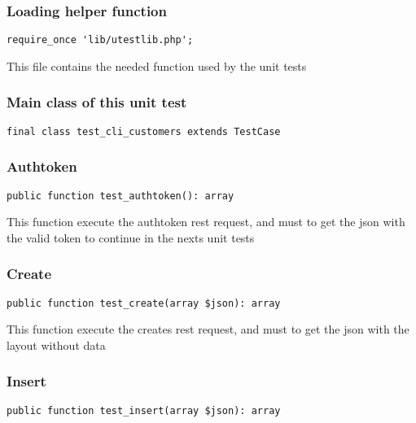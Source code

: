 \documentclass[a4paper]{article}
\begin{document}
\hypertarget{toc59}{}
\subsubsection{Loading helper function}

\begin{lstlisting}
require_once 'lib/utestlib.php';
\end{lstlisting}

This file contains the needed function used by the unit tests

\hypertarget{toc60}{}
\subsubsection{Main class of this unit test}

\begin{lstlisting}
final class test_cli_customers extends TestCase
\end{lstlisting}

\hypertarget{toc61}{}
\subsubsection{Authtoken}

\begin{lstlisting}
public function test_authtoken(): array
\end{lstlisting}

This function execute the authtoken rest request, and must to get the
json with the valid token to continue in the nexts unit tests

\hypertarget{toc62}{}
\subsubsection{Create}

\begin{lstlisting}
public function test_create(array $json): array
\end{lstlisting}

This function execute the creates rest request, and must to get the
json with the layout without data

\hypertarget{toc63}{}
\subsubsection{Insert}

\begin{lstlisting}
public function test_insert(array $json): array
\end{lstlisting}
\end{document}

